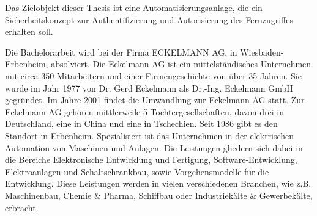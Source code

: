 \documentclass[11pt,a4paper]{report}
\begin{document}
Das Zielobjekt dieser Thesis ist eine Automatisierungsanlage, die ein Sicherheitskonzept zur Authentifizierung und Autorisierung des Fernzugriffes erhalten soll.

Die Bachelorarbeit wird bei der Firma ECKELMANN AG, in Wiesbaden-Erbenheim, absolviert. Die Eckelmann AG ist ein mittelständisches Unternehmen mit circa 350 Mitarbeitern und einer Firmengeschichte von über 35 Jahren. Sie wurde im Jahr 1977 von Dr. Gerd Eckelmann als  Dr.-Ing. Eckelmann GmbH gegründet. Im Jahre 2001 findet die Umwandlung zur Eckelmann AG statt. Zur Eckelmann AG gehören mittlerweile 5 Tochtergesellschaften, davon drei in Deutschland, eine in China und eine in Tschechien. Seit 1986 gibt es den Standort in Erbenheim. Spezialisiert ist das Unternehmen in der elektrischen Automation von Maschinen und Anlagen. Die Leistungen gliedern sich dabei in die Bereiche Elektronische Entwicklung und Fertigung, Software-Entwicklung, Elektroanlagen und Schaltschrankbau, sowie Vorgehensmodelle für die Entwicklung. Diese Leistungen werden in vielen verschiedenen Branchen, wie z.B. Maschinenbau, Chemie \& Pharma, Schiffbau oder Industriekälte \& Gewerbekälte, erbracht.
\end{document}
